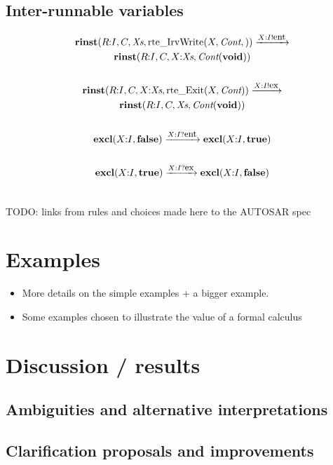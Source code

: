 \documentclass[twocolumn]{article}
\newcommand{\V}[1]{\mbox{\it #1}}
\newcommand{\Cont}{\V{Cont}}
\newcommand{\Xs}{\V{Xs}}
\newcommand{\void}{\mbox{\bf void}}
\newcommand{\true}{\mbox{\bf true}}
\newcommand{\false}{\mbox{\bf false}}
\newcommand{\seq}[2]{#1\hspace{-0.7ex}:\hspace{-0.7ex}#2}
\newcommand{\rinst}[4]{\mbox{\bf rinst}(#1,#2,#3,#4)}
\newcommand{\excl}[2]{\mbox{\bf excl}(#1,#2)}
\newcommand{\Exit}[2]{\mbox{rte\_Exit}(#1,#2)}
\newcommand{\IrvWrite}[3]{\mbox{rte\_IrvWrite}(#1,#2,#3)}
\newcommand{\red}[1]{\xrightarrow{#1}}
\newcommand{\say}[2]{#1 ! #2}
\newcommand{\hear}[2]{#1 ? #2}
\newcommand{\ent}{\mbox{\small ent}}
\newcommand{\ex}{\mbox{\small ex}}
\begin{document}
\subsection{Inter-runnable variables}

\begin{gather*}
	\rinst{\seq{R}{I}}{C}{\Xs}{\IrvWrite{X}{\Cont}}  \red{\say{X:I}{\ent}}  \\
		\rinst{\seq{R}{I}}{C}{\seq X \Xs}{\Cont(\void)} \\
	\\
	\rinst{\seq{R}{I}}{C}{\seq X \Xs}{\Exit{X}{\Cont}}  \red{\say{X:I}{\ex}}  \\
		\rinst{\seq{R}{I}}{C}{\Xs}{\Cont(\void)} \\
	\\
	\excl{\seq X I}{\false} \red{\hear{X:I}{\ent}} \excl{\seq X I}{\true} \\
	\\
	\excl{\seq X I}{\true} \red{\hear{X:I}{\ex}} \excl{\seq X I}{\false} \\
	\\
\end{gather*}


TODO: links from rules and choices made here to the AUTOSAR spec

\section{Examples}
\label{sec:Examples}

\begin{itemize}
\item More details on the simple examples + a bigger example.
\item Some examples chosen to illustrate the value of a formal calculus
\end{itemize}

\section{Discussion / results}
\label{sec:Disc}

\subsection{Ambiguities and alternative interpretations}
\label{sec:DiscAmb}

\subsection{Clarification proposals and improvements}
\label{sec:DiscImp}
\end{document}
